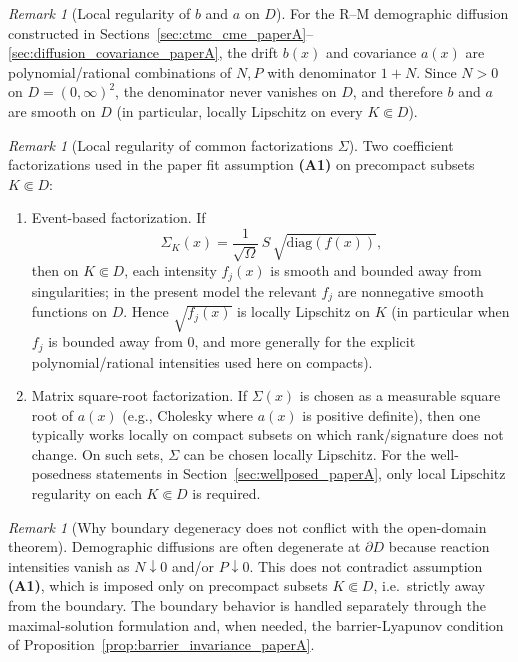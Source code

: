 \documentclass[pdflatex,sn-mathphys-ay]{sn-jnl}
\theoremstyle{thmstyleone}
\theoremstyle{definition}
\theoremstyle{remark}
\newtheorem{remark}[theorem]{Remark}
\begin{document}
\begin{appendices}
\begin{remark}[Local regularity of \(b\) and \(a\) on \(D\)]
\label{rmk:appC_ba_smooth}
For the R--M demographic diffusion constructed in Sections~\ref{sec:ctmc_cme_paperA}--\ref{sec:diffusion_covariance_paperA}, the drift \(b(x)\) and covariance \(a(x)\) are polynomial/rational combinations of \(N,P\) with denominator \(1+N\). Since \(N>0\) on \(D=(0,\infty)^2\), the denominator never vanishes on \(D\), and therefore \(b\) and \(a\) are smooth on \(D\) (in particular, locally Lipschitz on every \(K\Subset D\)).
\end{remark}

\begin{remark}[Local regularity of common factorizations \(\Sigma\)]
\label{rmk:appC_sigma_local_lipschitz}
Two coefficient factorizations used in the paper fit assumption \textbf{(A1)} on precompact subsets \(K\Subset D\):
\begin{enumerate}[label=(\roman*)]
\item Event-based factorization.
If
\[
\Sigma_K(x)=\frac{1}{\sqrt\Omega}\,S\,\sqrt{\mathrm{diag}(f(x))},
\]
then on \(K\Subset D\), each intensity \(f_j(x)\) is smooth and bounded away from singularities; in the present model the relevant \(f_j\) are nonnegative smooth functions on \(D\). Hence \(\sqrt{f_j(x)}\) is locally Lipschitz on \(K\) (in particular when \(f_j\) is bounded away from \(0\), and more generally for the explicit polynomial/rational intensities used here on compacts).
\item Matrix square-root factorization.
If \(\Sigma(x)\) is chosen as a measurable square root of \(a(x)\) (e.g., Cholesky where \(a(x)\) is positive definite), then one typically works locally on compact subsets on which rank/signature does not change. On such sets, \(\Sigma\) can be chosen locally Lipschitz. For the well-posedness statements in Section~\ref{sec:wellposed_paperA}, only local Lipschitz regularity on each \(K\Subset D\) is required.
\end{enumerate}
\end{remark}

\begin{remark}[Why boundary degeneracy does not conflict with the open-domain theorem]
\label{rmk:appC_boundary_degeneracy}
Demographic diffusions are often degenerate at \(\partial D\) because reaction intensities vanish as \(N\downarrow0\) and/or \(P\downarrow0\). This does not contradict assumption \textbf{(A1)}, which is imposed only on precompact subsets \(K\Subset D\), i.e.\ strictly away from the boundary. The boundary behavior is handled separately through the maximal-solution formulation and, when needed, the barrier-Lyapunov condition of Proposition~\ref{prop:barrier_invariance_paperA}.
\end{remark}


\end{appendices}
\end{document}
